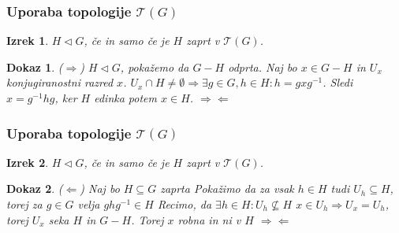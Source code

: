 \documentclass{beamer}
\newtheorem{izrek}{Izrek}
\newtheorem{dokaz}{Dokaz}
\begin{document}
\begin{frame}
\frametitle{Uporaba topologije $\mathcal{T}(G)$}

\begin{izrek}
    $H \triangleleft G$, če in samo če je $H$ zaprt v $\mathcal{T}(G)$.
    \pause
\end{izrek}

\begin{dokaz}
    ($\Rightarrow$)
    $H \triangleleft G$, pokažemo da $G - H$ odprta.
    \newline
    \pause
    Naj bo $x \in G - H$ in $U_x$ konjugiranostni razred $x$.
    \newline
    \pause
    $U_x \cap H \neq \emptyset \Rightarrow \exists g \in G, h \in H: h = gxg^{-1}$.
    \newline
    \pause
    Sledi $x = g^{-1}hg$, ker $H$ edinka potem $x \in H$.     
    \pause
    $\Rightarrow\!\Leftarrow$
\end{dokaz}

\end{frame}

\begin{frame}
    \frametitle{Uporaba topologije $\mathcal{T}(G)$}
    
    \begin{izrek}
        $H \triangleleft G$, če in samo če je $H$ zaprt v $\mathcal{T}(G)$.
    \end{izrek}
    
    \begin{dokaz}
        ($\Leftarrow$) Naj bo $H \subseteq G$ zaprta
        \newline
        \pause
        Pokažimo da za vsak $h \in H$ tudi $U_h \subseteq H$, torej za $g \in G$ velja $ghg^{-1} \in H$ %
        \newline
        \pause
        Recimo, da $\exists h \in H: U_h \nsubseteq H$
        \newline
        \pause
        $x \in U_h \Rightarrow U_x = U_h$, torej $U_x$ seka $H$ in $G - H$.
        \newline
        \pause
        Torej $x$ robna in ni v $H$
        \pause
        $\Rightarrow\!\Leftarrow$

    \end{dokaz}


\end{frame}
\end{document}
